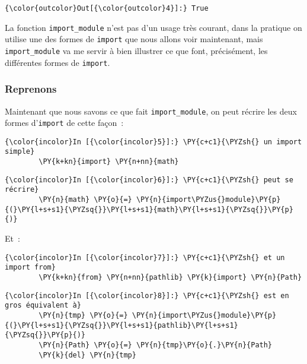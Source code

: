 \begin{Verbatim}[commandchars=\\\{\}]
{\color{outcolor}Out[{\color{outcolor}4}]:} True
\end{Verbatim}
            
    La fonction \texttt{import\_module} n'est pas d'un usage très courant,
dans la pratique on utilise une des formes de \texttt{import} que nous
allons voir maintenant, mais \texttt{import\_module} va me servir à bien
illustrer ce que font, précisément, les différentes formes de
\texttt{import}.

    \hypertarget{reprenons}{%
\subsubsection{Reprenons}\label{reprenons}}

    Maintenant que nous savons ce que fait \texttt{import\_module}, on peut
récrire les deux formes d'\texttt{import} de cette façon~:

    \begin{Verbatim}[commandchars=\\\{\}]
{\color{incolor}In [{\color{incolor}5}]:} \PY{c+c1}{\PYZsh{} un import simple}
        \PY{k+kn}{import} \PY{n+nn}{math}
\end{Verbatim}


    \begin{Verbatim}[commandchars=\\\{\}]
{\color{incolor}In [{\color{incolor}6}]:} \PY{c+c1}{\PYZsh{} peut se récrire}
        \PY{n}{math} \PY{o}{=} \PY{n}{import\PYZus{}module}\PY{p}{(}\PY{l+s+s1}{\PYZsq{}}\PY{l+s+s1}{math}\PY{l+s+s1}{\PYZsq{}}\PY{p}{)}
\end{Verbatim}


    Et~:

    \begin{Verbatim}[commandchars=\\\{\}]
{\color{incolor}In [{\color{incolor}7}]:} \PY{c+c1}{\PYZsh{} et un import from}
        \PY{k+kn}{from} \PY{n+nn}{pathlib} \PY{k}{import} \PY{n}{Path}
\end{Verbatim}


    \begin{Verbatim}[commandchars=\\\{\}]
{\color{incolor}In [{\color{incolor}8}]:} \PY{c+c1}{\PYZsh{} est en gros équivalent à}
        \PY{n}{tmp} \PY{o}{=} \PY{n}{import\PYZus{}module}\PY{p}{(}\PY{l+s+s1}{\PYZsq{}}\PY{l+s+s1}{pathlib}\PY{l+s+s1}{\PYZsq{}}\PY{p}{)}
        \PY{n}{Path} \PY{o}{=} \PY{n}{tmp}\PY{o}{.}\PY{n}{Path}
        \PY{k}{del} \PY{n}{tmp}
\end{Verbatim}


